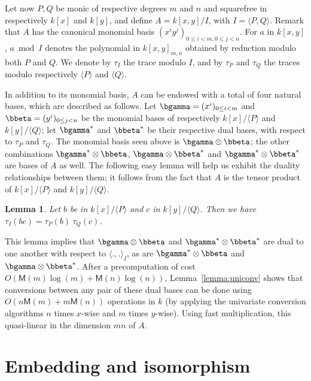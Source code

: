 \documentclass{sig-alternate}
\def\M {\ensuremath{\mathsf{M}}}
\newcounter{algo}
\newcommand{\ang}[1]{\langle#1\rangle}
\newtheorem{Lemma}{Lemma}
\begin{document}
 Let now $P,Q$ be monic of
respective degrees $m$ and $n$ and squarefree in respectively $k[x]$
and $k[y]$, and define $A=k[x,y]/I$, with $I=\ang{P,Q}$. Remark that
$A$ has the canonical monomial basis $(x^i y^j)_{0 \le i <m, 0 \le j <
  n}$. For $a$ in $k[x,y]$, $a \bmod I$ denotes the polynomial in
$k[x,y]_{m,n}$ obtained by reduction modulo both $P$ and $Q$.  We
denote by $\tau_I$ the trace modulo $I$, and by $\tau_P$ and $\tau_Q$
the traces modulo respectively $\ang{P}$ and $\ang{Q}$.

In addition to its monomial basis, $A$ can be endowed with a total of
four natural bases, which are described as follows. Let
$\bgamma=(x^i)_{0 \le i < m}$ and $\bbeta=(y^i)_{0 \le j < n}$ be the
monomial bases of respectively $k[x]/\ang{P}$ and $k[y]/\ang{Q}$; let
$\bgamma^\ast$ and $\bbeta^\ast$ be their respective dual bases, with
respect to $\tau_P$ and $\tau_Q$. The monomial basis seen above is
$\bgamma \otimes \bbeta$; the other combinations $\bgamma^\ast \otimes
\bbeta$, $\bgamma \otimes \bbeta^\ast$ and $\bgamma^\ast \otimes
\bbeta^\ast$ are bases of $A$ as well. The following easy lemma will
help us exhibit the duality relationships between them; it follows
from the fact that $A$ is the tensor product of $k[x]/\ang{P}$ and
$k[y]/\ang{Q}$.

\begin{Lemma}
  \label{lemma:traces:PQR1}
  Let $b$ be in $k[x]/\ang{P}$ and $c$ in $k[y]/\ang{Q}$. Then we have
  $\tau_I(bc) = \tau_P(b) \ \tau_Q(c)$.
\end{Lemma}

This lemma implies that $\bgamma \otimes \bbeta$ and $\bgamma^\ast
\otimes \bbeta^\ast$ are dual to one another with respect to
$\ang{.,.}_I$, as are $\bgamma^\ast \otimes \bbeta$ and $\bgamma
\otimes \bbeta^\ast$. After a precomputation of cost $O(\M(m)\log(m) +
\M(n)\log(n))$, Lemma~\ref{lemma:uniconv} shows that conversions
between any pair of these dual bases can be done using
$O(n\M(m)+m\M(n))$ operations in $k$ (by applying the univariate
conversion algorithms $n$ times $x$-wise and $m$ times $y$-wise). Using
fast multiplication, this quasi-linear in the dimension $mn$ of $A$.


\section{Embedding and isomorphism} \label{sec:emb-iso}
\end{document}
